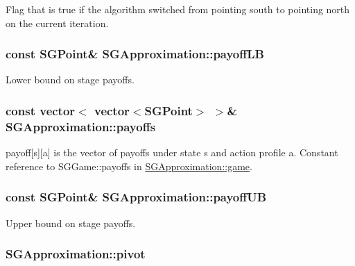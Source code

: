 Flag that is true if the algorithm switched from pointing south to pointing north on the current iteration. \hypertarget{class_s_g_approximation_a730a565edb81ab25cf99b8af3e8781ef}{
\subsubsection[{payoff\+L\+B}]{\setlength{\rightskip}{0pt plus 5cm}const {\bf S\+G\+Point}\& S\+G\+Approximation\+::payoff\+L\+B\hspace{0.3cm}{\ttfamily [private]}}}\label{class_s_g_approximation_a730a565edb81ab25cf99b8af3e8781ef}
Lower bound on stage payoffs. \hypertarget{class_s_g_approximation_aad5b271ff927a7f21080aab138cdd471}{
\subsubsection[{payoffs}]{\setlength{\rightskip}{0pt plus 5cm}const vector$<$ vector$<${\bf S\+G\+Point}$>$ $>$\& S\+G\+Approximation\+::payoffs\hspace{0.3cm}{\ttfamily [private]}}}\label{class_s_g_approximation_aad5b271ff927a7f21080aab138cdd471}
payoff\mbox{[}s\mbox{]}\mbox{[}a\mbox{]} is the vector of payoffs under state s and action profile a. Constant reference to S\+G\+Game\+::payoffs in \hyperlink{class_s_g_approximation_a3244a3d7de5f2b909d438f5b4ab337ee}{S\+G\+Approximation\+::game}. \hypertarget{class_s_g_approximation_a1b9d13241c1d3757f70099e3d6c279f5}{
\subsubsection[{payoff\+U\+B}]{\setlength{\rightskip}{0pt plus 5cm}const {\bf S\+G\+Point}\& S\+G\+Approximation\+::payoff\+U\+B\hspace{0.3cm}{\ttfamily [private]}}}\label{class_s_g_approximation_a1b9d13241c1d3757f70099e3d6c279f5}
Upper bound on stage payoffs. \hypertarget{class_s_g_approximation_ad7e37739a8b457ebe4a1c1e32bf9ca6c}{
\subsubsection[{pivot}]{ S\+G\+Approximation\+::pivot\hspace{0.3cm}{\ttfamily [private]}}}\label{class_s_g_approximation_ad7e37739a8b457ebe4a1c1e32bf9ca6c}
